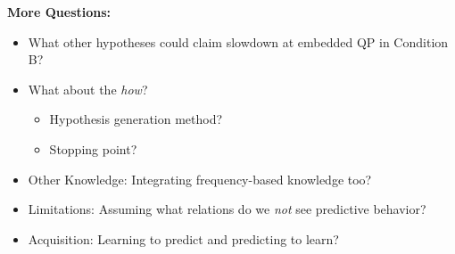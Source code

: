\documentclass[12pt]{article}
\begin{document}
\textbf{More Questions:}
\begin{itemize}
    \item What other hypotheses could claim slowdown at embedded QP in Condition B?
    \item What about the \textit{how}?
        \begin{itemize}
            \item Hypothesis generation method?
            \item Stopping point?
        \end{itemize}
    \item Other Knowledge: Integrating frequency-based knowledge too?
    \item Limitations: Assuming what relations do we \textit{not} see predictive behavior?
    \item Acquisition: Learning to predict and predicting to learn?
\end{itemize}
\end{document}
